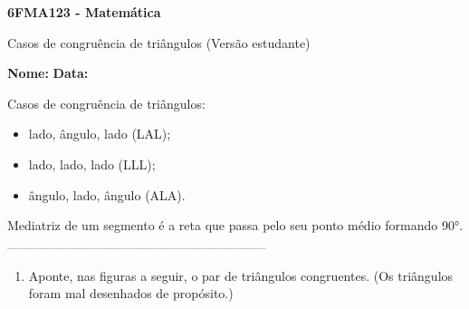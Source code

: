 \documentclass[a4paper,14pt]{article}
\begin{document}
	
	\noindent\textbf{6FMA123 - Matemática} 
	
	\begin{center}Casos de congruência de triângulos (Versão estudante)
	\end{center}
	
	\noindent\textbf{Nome:} \underline{\hspace{10cm}}
	\noindent\textbf{Data:} \underline{\hspace{4cm}}
	
	
	\begin{multicols}{2}
	    \noindent Casos de congruência de triângulos:
	    \begin{itemize}
	    	\item lado, ângulo, lado (LAL);
	    	\item lado, lado, lado (LLL);
	    	\item ângulo, lado, ângulo (ALA).
	    \end{itemize}
	    Mediatriz de um segmento é a reta que passa pelo seu ponto médio formando 90°.
		\noindent\textsubscript{--------------------------------------------------------------------------}
		\begin{enumerate} 
			\item Aponte, nas figuras a seguir, o par de triângulos congruentes. (Os triângulos foram mal desenhados de propósito.)

\end{enumerate}
\end{multicols}
\end{document}
